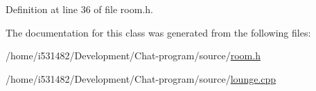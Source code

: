 Definition at line 36 of file room.\+h.



The documentation for this class was generated from the following files\+:\begin{DoxyCompactItemize}
\item 
/home/i531482/\+Development/\+Chat-\/program/source/\hyperlink{room_8h}{room.\+h}\item 
/home/i531482/\+Development/\+Chat-\/program/source/\hyperlink{lounge_8cpp}{lounge.\+cpp}\end{DoxyCompactItemize}
